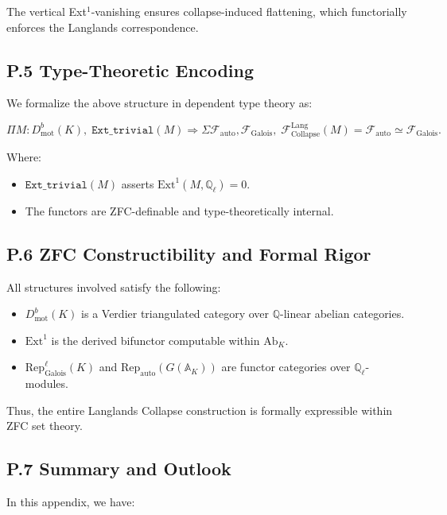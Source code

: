 \documentclass[11pt]{article}
\begin{document}
The vertical Ext$^1$-vanishing ensures collapse-induced flattening, which functorially enforces the Langlands correspondence.

\subsection*{P.5 Type-Theoretic Encoding}

We formalize the above structure in dependent type theory as:

\[
\Pi M : D^b_{\mathrm{mot}}(K),\;
\texttt{Ext\_trivial}(M) \Rightarrow
\Sigma \mathcal{F}_{\mathrm{auto}}, \mathcal{F}_{\mathrm{Galois}},\;
\mathcal{F}_{\mathrm{Collapse}}^{\mathrm{Lang}}(M) = \mathcal{F}_{\mathrm{auto}} \simeq \mathcal{F}_{\mathrm{Galois}}.
\]

Where:
\begin{itemize}
  \item $\texttt{Ext\_trivial}(M)$ asserts $\mathrm{Ext}^1(M, \mathbb{Q}_\ell) = 0$.
  \item The functors are ZFC-definable and type-theoretically internal.
\end{itemize}

\subsection*{P.6 ZFC Constructibility and Formal Rigor}

All structures involved satisfy the following:

\begin{itemize}
  \item $D^b_{\mathrm{mot}}(K)$ is a Verdier triangulated category over $\mathbb{Q}$-linear abelian categories.
  \item $\mathrm{Ext}^1$ is the derived bifunctor computable within $\mathrm{Ab}_K$.
  \item $\mathrm{Rep}^\ell_{\mathrm{Galois}}(K)$ and $\mathrm{Rep}_{\mathrm{auto}}(G(\mathbb{A}_K))$ are functor categories over $\mathbb{Q}_\ell$-modules.
\end{itemize}

Thus, the entire Langlands Collapse construction is formally expressible within ZFC set theory.

\subsection*{P.7 Summary and Outlook}

In this appendix, we have:
\end{document}

